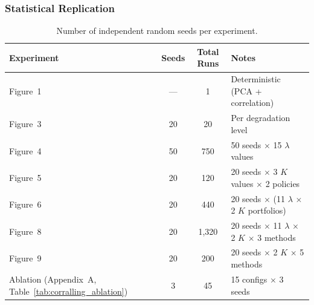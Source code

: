 \subsubsection{Statistical Replication}

\begin{table}[h]
\centering
\caption{Number of independent random seeds per experiment.}
\label{tab:seeds}
\small
\begin{tabular}{@{}lccl@{}}
\toprule
\textbf{Experiment} & \textbf{Seeds} & \textbf{Total Runs} & \textbf{Notes} \\
\midrule
Figure~1 & --- & 1 & Deterministic (PCA + correlation) \\
Figure~3 & 20 & 20 & Per degradation level \\
Figure~4 & 50 & 750 & 50 seeds $\times$ 15 $\lambda$ values \\
Figure~5 & 20 & 120 & 20 seeds $\times$ 3 $K$ values $\times$ 2 policies \\
Figure~6 & 20 & 440 & 20 seeds $\times$ (11 $\lambda$ $\times$ 2 $K$ portfolios) \\
Figure~8 & 20 & 1,320 & 20 seeds $\times$ 11 $\lambda$ $\times$ 2 $K$ $\times$ 3 methods \\
Figure~9 & 20 & 200 & 20 seeds $\times$ 2 $K$ $\times$ 5 methods \\
Ablation (Appendix~A, Table~\ref{tab:corralling_ablation}) & 3 & 45 & 15 configs $\times$ 3 seeds \\
\bottomrule
\end{tabular}
\end{table}
